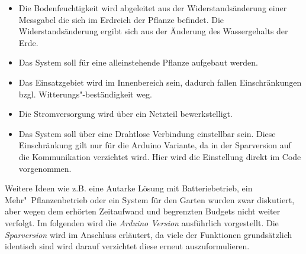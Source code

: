 \documentclass[]{IEEEtran}
\begin{document}
\begin{itemize}
	\item Die Bodenfeuchtigkeit wird abgeleitet aus der Widerstandsänderung einer Messgabel die sich im Erdreich der Pflanze befindet. Die Widerstandsänderung ergibt sich aus der Änderung des Wassergehalts der Erde.
	\item Das System soll für eine alleinstehende Pflanze aufgebaut werden. 
	\item Das Einsatzgebiet wird im Innenbereich sein, dadurch fallen Einschränkungen bzgl. Witterungs"-beständigkeit weg.
	\item Die Stromversorgung wird über ein Netzteil bewerkstelligt. 
	\item Das System soll über eine Drahtlose Verbindung einstellbar sein. Diese Einschränkung gilt nur für die Arduino Variante, da in der Sparversion auf die Kommunikation verzichtet wird. Hier wird die Einstellung direkt im Code vorgenommen.

\end{itemize}

Weitere Ideen wie z.B. eine Autarke Lösung mit Batteriebetrieb, ein Mehr"~Pflanzenbetrieb oder ein System für den Garten wurden zwar diskutiert, aber wegen dem erhörten Zeitaufwand und begrenzten Budgets nicht weiter verfolgt. 
Im folgenden wird die \emph{Arduino Version} ausführlich vorgestellt. 
Die \emph{Sparversion} wird im Anschluss erläutert, da viele der Funktionen grundsätzlich identisch sind wird darauf verzichtet diese erneut auszuformulieren. 







\end{document}
